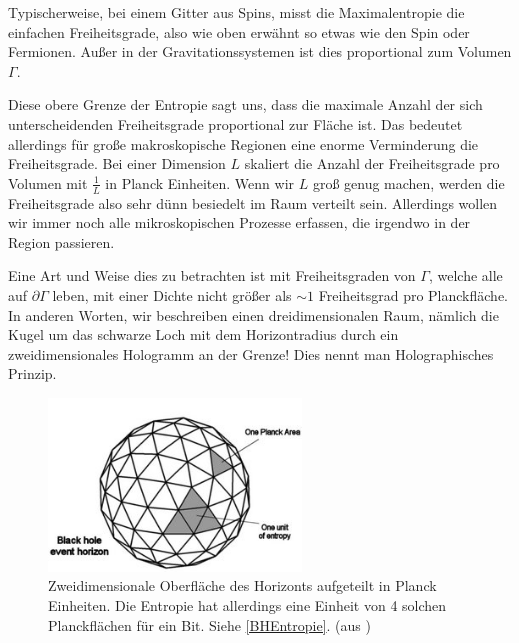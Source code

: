 \documentclass[ngerman]{scrartcl}
\begin{document}
Typischerweise, bei einem Gitter aus Spins, misst die Maximalentropie die einfachen Freiheitsgrade, also wie oben erwähnt so etwas wie den Spin oder Fermionen. Außer in der Gravitationssystemen ist dies proportional zum Volumen $\Gamma$. 

Diese obere Grenze der Entropie sagt uns, dass die maximale Anzahl der sich unterscheidenden Freiheitsgrade proportional zur Fläche ist. Das bedeutet allerdings für große makroskopische Regionen eine enorme Verminderung die Freiheitsgrade. Bei einer Dimension $L$ skaliert die Anzahl der Freiheitsgrade pro Volumen mit $\frac{1}{L}$ in Planck Einheiten.
Wenn wir $L$ groß genug machen, werden die Freiheitsgrade also sehr dünn besiedelt im Raum verteilt sein. Allerdings wollen wir immer noch alle mikroskopischen Prozesse erfassen, die irgendwo in der Region passieren. 

Eine Art und Weise dies zu betrachten ist mit Freiheitsgraden von $\Gamma$, welche alle auf $\partial \Gamma$ leben, mit einer Dichte nicht größer als $\sim 1$ Freiheitsgrad pro Planckfläche. In anderen Worten, wir beschreiben einen dreidimensionalen Raum, nämlich die Kugel um das schwarze Loch mit dem Horizontradius durch ein zweidimensionales Hologramm an der Grenze! Dies nennt man Holographisches Prinzip. 

	\begin{figure}
		\begin{center}
			\includegraphics[width=0.6\textwidth]{BHentropy1}
		\end{center}
		\caption{Zweidimensionale Oberfläche des Horizonts aufgeteilt in Planck Einheiten. Die Entropie hat allerdings eine Einheit von 4 solchen Planckflächen für ein Bit. Siehe \ref{BHEntropie}. (aus \cite{BekensteinHawking})}
	\end{figure} 
\end{document}
